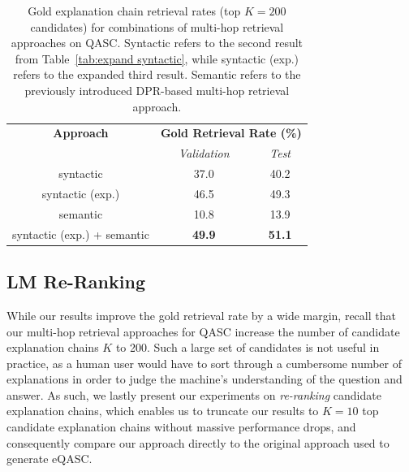 \documentclass[letterpaper]{article} %
\begin{document}
\begin{table}
    \centering
    \footnotesize
    \begin{tabular}{c|cc}
    \toprule
        \textbf{Approach}  & \multicolumn{2}{c}{\textbf{Gold Retrieval Rate (\%)}} \\
         & \textit{Validation} & \textit{Test} \\\midrule
        syntactic & 37.0 & 40.2 \\
        syntactic (exp.) & 46.5 & 49.3 \\
        semantic & 10.8 & 13.9 \\
        syntactic (exp.) + semantic & \textbf{49.9} & \textbf{51.1} \\
        \bottomrule
    \end{tabular}
    \normalsize
    \caption{Gold explanation chain retrieval rates (top $K=200$ candidates) for combinations of multi-hop retrieval approaches on QASC. Syntactic refers to the second result from Table~\ref{tab:expand syntactic}, while syntactic (exp.) refers to the expanded third result. Semantic refers to the previously introduced DPR-based multi-hop retrieval approach.}
    \vspace{-1em}
    \label{tab:semantic}
\end{table}


\subsection{LM Re-Ranking}
While our results improve the gold retrieval rate by a wide margin, recall that our multi-hop retrieval approaches for QASC increase the number of candidate explanation chains $K$ to 200. Such a large set of candidates is not useful in practice, as a human user would have to sort through a cumbersome number of explanations in order to judge the machine's understanding of the question and answer. As such, we lastly present our experiments on \textit{re-ranking} candidate explanation chains, which enables us to truncate our results to $K=10$ top candidate explanation chains without massive performance drops, and consequently compare our approach directly to the original approach used to generate eQASC.
\end{document}
